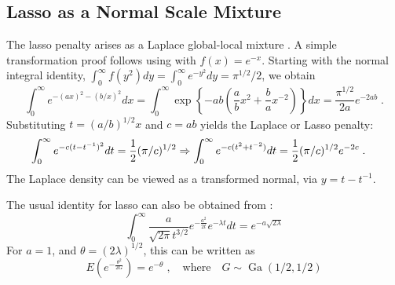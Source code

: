 \documentclass[lineno]{biometrika}
\begin{document}
\subsection{Lasso as a Normal Scale Mixture}
The lasso penalty arises as a Laplace global-local mixture
\citep{andrews_scale_1974}.  A simple transformation proof follows using \CS{}
with $f(x) = e^{-x}$.  Starting with the normal integral identity, 
$\int_{0}^{\infty} f(y^2) dy = \int_0^\infty e^{-y^2} dy = \pi^{1/2}/2 $, we
obtain
$$
\int_0^\infty e^{-(a x)^2 - (b/x)^2} d x 
= \int_0^{\infty} 
\exp\left\{-a b \left(\frac{a}{b} x^2 + \frac{b}{a} x^{-2} \right)\right\} dx 
= \frac{\pi^{1/2}}{2a} e^{-2 a b}
\;.
$$
Substituting $t = (a/b)^{1/2} x$ and $c = ab$ yields the Laplace or Lasso penalty:  
\begin{align*}
  \int_0^\infty e^{- c (t - t^{-1})^2} dt 
  &= \frac{1}{2} (\pi/c)^{1/2} 
  \Rightarrow \int_0^\infty e^{- c (t^2 + t^{-2})} dt 
  = \frac{1}{2} (\pi/c)^{1/2} e^{-2c}
  \;. 
\end{align*}
The Laplace density can be viewed as a transformed normal, via $y = t - t^{-1}$.

\begin{remark}
The usual identity for lasso can also be obtained from \citet{levy1940certains}:
\begin{equation}
  \int_{0}^{\infty} \frac{a}{\sqrt{2 \pi} t^{3/2}} 
  e^{-\frac{a^2}{2 t}} e^{-\lambda t} dt 
  = e^{-a \sqrt{2 \lambda}} 
  \label{eq:levy}
\end{equation}
For $a = 1$, and $\theta = (2 \lambda)^{1/2}$, this can be written as 
\begin{equation}
  E\left(e^{-\frac{\theta^2}{2 G}}\right) = e^{-\theta}
  \;, 
  \quad\text{where}\quad 
  G \sim \operatorname{Ga}(1/2, 1/2) 
  \label{eq:gamma}
\end{equation}
\end{remark}
\end{document}
